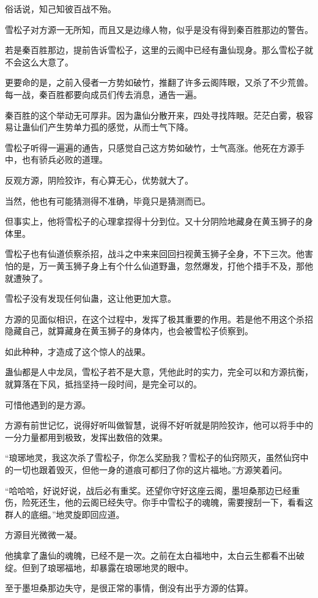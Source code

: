 \begin{this_body}
俗话说，知己知彼百战不殆。

雪松子对方源一无所知，而且又是边缘人物，似乎是没有得到秦百胜那边的警告。

若是秦百胜那边，提前告诉雪松子，这里的云阁中已经有蛊仙现身。那么雪松子就不会这么大意了。

更要命的是，之前入侵者一方势如破竹，推翻了许多云阁阵眼，又杀了不少荒兽。每一战，秦百胜都要向成员们传去消息，通告一遍。

秦百胜的这个举动无可厚非。因为蛊仙分散开来，四处寻找阵眼。茫茫白雾，极容易让蛊仙们产生势单力孤的感觉，从而士气下降。

雪松子听得一遍遍的通告，只感觉自己这方势如破竹，士气高涨。他死在方源手中，也有骄兵必败的道理。

反观方源，阴险狡诈，有心算无心，优势就大了。

当然，他也有可能猜测得不准确，毕竟只是猜测而已。

但事实上，他将雪松子的心理拿捏得十分到位。又十分阴险地藏身在黄玉狮子的身体里。

雪松子也有仙道侦察杀招，战斗之中来来回回扫视黄玉狮子全身，不下三次。他害怕的是，万一黄玉狮子身上有个什么仙道野蛊，忽然爆发，打他个措手不及，那他就遭殃了。

雪松子没有发现任何仙蛊，这让他更加大意。

方源的见面似相识，在这个过程中，发挥了极其重要的作用。若是他不用这个杀招隐藏自己，就算藏身在黄玉狮子的身体内，也会被雪松子侦察到。

如此种种，才造成了这个惊人的战果。

蛊仙都是人中龙凤，雪松子若不是大意，凭他此时的实力，完全可以和方源抗衡，就算落在下风，抵挡坚持一段时间，是完全可以的。

可惜他遇到的是方源。

方源有前世记忆，说得好听叫做智慧，说得不好听就是阴险狡诈，他可以将手中的一分力量都用到极致，发挥出数倍的效果。

“琅琊地灵，我这次杀了雪松子，你怎么奖励我？雪松子的仙窍陨灭，虽然仙窍中的一切也跟着毁灭，但他一身的道痕可都归了你的这片福地。”方源笑着问。

“哈哈哈，好说好说，战后必有重奖。还望你守好这座云阁，墨坦桑那边已经重伤，险死还生，他的云阁已经失守。你手中雪松子的魂魄，需要搜刮一下，看看这群人的底细。”地灵旋即回应道。

方源目光微微一凝。

他擒拿了蛊仙的魂魄，已经不是一次。之前在太白福地中，太白云生都看不出破绽。但到了琅琊福地，却暴露在琅琊地灵的眼中。

至于墨坦桑那边失守，是很正常的事情，倒没有出乎方源的估算。


\end{this_body}
